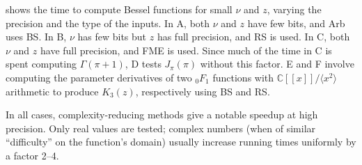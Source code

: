 \documentclass[review,nohypdvips]{siamart0216}
\begin{document}
 shows the time to compute Bessel functions
for small $\nu$ and $z$,
varying the precision and the type of the inputs.
In A, both $\nu$ and $z$ have few bits, and Arb uses BS.
In B, $\nu$ has few bits but $z$ has full precision, and RS is used.
In C, both $\nu$ and $z$ have full precision, and FME is used.
Since much of the time in C is spent computing $\Gamma(\pi+1)$,
D tests $J_{\pi}(\pi)$ without this factor.
E and F involve computing the parameter derivatives
of two ${}_0F_1$ functions with $\mathbb{C}[[x]] / \langle x^2 \rangle$
arithmetic to produce $K_3(z)$, respectively using BS and RS.

In all cases, complexity-reducing methods give a notable speedup at high precision.
Only real values are tested; complex numbers (when of similar
``difficulty'' on the function's domain)
usually increase running times uniformly by a factor 2--4.
\end{document}

